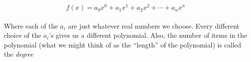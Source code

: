 \[f(x) = a_0 x^0 + a_1 x^1 + a_2 x^2 + \cdots + a_n x^n\]\\

Where each of the $a_i$ are just whatever real numbers we choose. Every different choice of the $a_i$'s gives us a different polynomial. Also, the number of items in the polynomial (what we might think of as the ``length'' of the polynomial) is called the \emph{degree}
